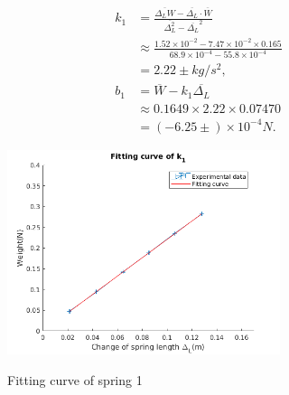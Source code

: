     \begin{figure}[htbp]    
        \begin{minipage}{0.5\linewidth}
            \[
            \begin{split}
                k_1&=\frac{\overline{\Delta_LW}-\overline{\Delta_L}\cdot\overline{W}}{\overline{\Delta_L^2}-\overline{\Delta_L}^2}\\[0.2cm]
                &\approx \frac{1.52\times10^{-2}-7.47\times10^{-2}\times0.165}{68.9\times10^{-4}-55.8\times10^{-4}}\\[0.2cm]
                &=2.22\pm kg/s^2,\\[0.4cm]
                b_1&=\overline{W}-k_1\overline{\Delta_L}\\[0.2cm]
                &\approx 0.1649\times 2.22 \times 0.07470\\[0.2cm]
                &=(-6.25\pm )\times10^{-4}N.
            \end{split}
            \]
        \end{minipage}
        \begin{minipage}{0.4\linewidth}
            \centering
            \label{k_1}
            \includegraphics[height=6cm]{images/k1.png}
        \end{minipage}

            \caption{Fitting curve of spring 1}
    \end{figure}

